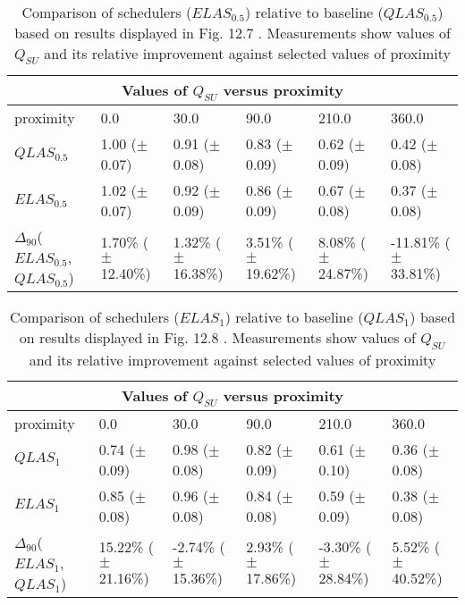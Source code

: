 \clearpage
\begin{landscape}
\begin{table}[h]
\begin{center}
\begin{tabular}{llllll}
\toprule
\multicolumn{6}{c}{Values of $Q_{SU}$ versus proximity}\\
\midrule
proximity & 0.0 & 30.0 & 90.0 & 210.0 & 360.0\\
\midrule
$QLAS_{0.5}$ &  1.00 ($\pm$0.07) &  0.91 ($\pm$0.08) &  0.83 ($\pm$0.09) &  0.62 ($\pm$0.09) &  0.42 ($\pm$0.08)\\
\midrule
$ELAS_{0.5}$ &  1.02 ($\pm$0.07) &  0.92 ($\pm$0.09) &  0.86 ($\pm$0.09) &  0.67 ($\pm$0.08) &  0.37 ($\pm$0.08)\\
$\Delta_{90}$($ELAS_{0.5}$,$QLAS_{0.5}$) & 1.70\% ($\pm$12.40\%) & 1.32\% ($\pm$16.38\%) & 3.51\% ($\pm$19.62\%) & 8.08\% ($\pm$24.87\%) & -11.81\% ($\pm$33.81\%)\\
\bottomrule
\end{tabular}
\end{center}
\caption[Comparison of $Q_{SU}$ versus proximity for $ELAS_{0.5}$ relative to $QLAS_{0.5}$.]{Comparison of schedulers ($ELAS_{0.5}$) relative to baseline ($QLAS_{0.5}$) based on results displayed in Fig. 12.7 . Measurements show values of $Q_{SU}$ and its relative improvement against selected values of proximity}
\label{b:f127}
\end{table}
\end{landscape}


\clearpage
\begin{landscape}
\begin{table}[h]
\begin{center}
\begin{tabular}{llllll}
\toprule
\multicolumn{6}{c}{Values of $Q_{SU}$ versus proximity}\\
\midrule
proximity & 0.0 & 30.0 & 90.0 & 210.0 & 360.0\\
\midrule
$QLAS_1$ &  0.74 ($\pm$0.09) &  0.98 ($\pm$0.08) &  0.82 ($\pm$0.09) &  0.61 ($\pm$0.10) &  0.36 ($\pm$0.08)\\
\midrule
$ELAS_1$ &  0.85 ($\pm$0.08) &  0.96 ($\pm$0.08) &  0.84 ($\pm$0.08) &  0.59 ($\pm$0.09) &  0.38 ($\pm$0.08)\\
$\Delta_{90}$($ELAS_1$,$QLAS_1$) & 15.22\% ($\pm$21.16\%) & -2.74\% ($\pm$15.36\%) & 2.93\% ($\pm$17.86\%) & -3.30\% ($\pm$28.84\%) & 5.52\% ($\pm$40.52\%)\\
\bottomrule
\end{tabular}
\end{center}
\caption[Comparison of $Q_{SU}$ versus proximity for $ELAS_1$ relative to $QLAS_1$.]{Comparison of schedulers ($ELAS_1$) relative to baseline ($QLAS_1$) based on results displayed in Fig. 12.8 . Measurements show values of $Q_{SU}$ and its relative improvement against selected values of proximity}
\label{b:f128}
\end{table}
\end{landscape}


